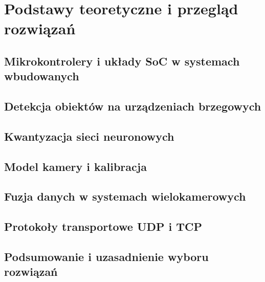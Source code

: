 \chapter{Podstawy teoretyczne i przegląd rozwiązań}
\label{chap:podstawy}

\section{Mikrokontrolery i układy SoC w systemach wbudowanych}
\label{sec:mikrokontroler}

\section{Detekcja obiektów na urządzeniach brzegowych}
\label{sec:detekcja-edge}

\section{Kwantyzacja sieci neuronowych}
\label{sec:kwantyzacja}

\section{Model kamery i kalibracja}
\label{sec:model-kamery}

\section{Fuzja danych w systemach wielokamerowych}
\label{sec:fuzja-teoria}

\section{Protokoły transportowe UDP i TCP}
\label{sec:udp-tcp}

\section{Podsumowanie i uzasadnienie wyboru rozwiązań}
\label{sec:wybor-rozwiazan}
